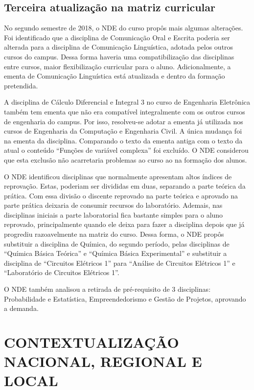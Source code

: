 \subsection{Terceira atualização na matriz curricular}

No segundo semestre de 2018, o NDE do curso propôs mais algumas alterações. Foi identificado que a disciplina de Comunicação Oral e Escrita poderia ser alterada para a disciplina de Comunicação Linguística, adotada pelos outros cursos do campus. Dessa forma haveria uma compatibilização das disciplinas entre cursos, maior flexibilização curricular para o aluno. Adicionalmente, a ementa de Comunicação Linguística está atualizada e dentro da formação pretendida. 

A disciplina de Cálculo Diferencial e Integral 3 no curso de Engenharia Eletrônica também tem ementa que não era compatível integralmente com os outros cursos de engenharia do campus. Por isso, resolveu-se adotar a ementa já utilizada nos cursos de Engenharia da Computação e Engenharia Civil. A única mudança foi na ementa da disciplina. Comparando o texto da ementa antiga com o texto da atual o conteúdo ``Funções de variável complexa'' foi excluído. O NDE considerou que esta exclusão não acarretaria problemas ao curso ao na formação dos alunos.

O NDE identificou disciplinas que normalmente apresentam altos índices de reprovação. Estas, poderiam ser divididas em duas, separando a parte teórica da prática. Com essa divisão o discente reprovado na parte teórica e aprovado na parte prática deixaria de consumir recursos do laboratório. Ademais, nas disciplinas iniciais a parte laboratorial fica bastante simples para o aluno reprovado, principalmente quando ele deixa para fazer a disciplina depois que já progrediu razoavelmente na matriz do curso. Dessa forma, o NDE propôs substituir a disciplina de Química, do segundo período, pelas disciplinas de ``Química Básica Teórica'' e ``Química Básica Experimental'' e substituir a disciplina de ``Circuitos Elétricos 1'' para ``Análise de Circuitos Elétricos 1'' e ``Laboratório de Circuitos Elétricos 1''.

O NDE também analisou a retirada de pré-requisito de 3 disciplinas: Probabilidade e Estatística, Empreendedorismo e Gestão de Projetos, aprovando a demanda.

\section{CONTEXTUALIZAÇÃO NACIONAL, REGIONAL E LOCAL}

